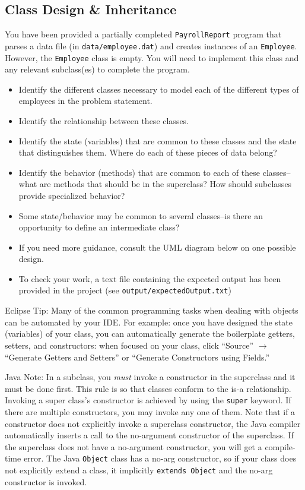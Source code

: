 \documentclass[12pt]{scrartcl}
\begin{document}
\subsection*{Class Design \& Inheritance}

You have been provided a partially completed 
\texttt{PayrollReport} program that parses a data file 
(in \texttt{data/employee.dat}) and creates instances of an 
\texttt{Employee}.  However, the \texttt{Employee} 
class is empty.  You will need to implement this class and any relevant 
subclass(es) to complete the program.  
\begin{itemize}
  \item Identify the different classes necessary to model each of the 
    different types of employees in the problem statement.
  \item Identify the relationship between these classes.
  \item Identify the state (variables) that are common to these classes 
    and the state that distinguishes them.  Where do each of these 
    pieces of data belong?
  \item Identify the behavior (methods) that are common to each of 
    these classes--what are methods that should be in the superclass?  
    How should subclasses provide specialized behavior?
  \item Some state/behavior may be common to several classes--is there 
    an opportunity to define an intermediate class?
  \item If you need more guidance, consult the UML diagram below on 
    one possible design.
  \item To check your work, a text file containing the expected output 
    has been provided in the project (see 
    \texttt{output/expectedOutput.txt})
\end{itemize}

Eclipse Tip: Many of the common programming tasks when dealing with 
objects can be automated by your IDE.  For example: once you have 
designed the state (variables) of your class, you can automatically 
generate the boilerplate getters, setters, and constructors: when 
focused on your class, click ``Source'' $\rightarrow$ ``Generate Getters 
and Setters'' or ``Generate Constructors using Fields.''

Java Note: In a subclass, you \emph{must} invoke a constructor in 
the superclass and it must be done first.  This rule is so that 
classes conform to the is-a relationship.  Invoking a super class's 
constructor is achieved by using the \texttt{super} keyword.  
If there are multiple constructors, you may invoke any one of them.  
Note that if a constructor does not explicitly invoke a superclass 
constructor, the Java compiler automatically inserts a call to the 
no-argument constructor of the superclass. If the superclass does 
not have a no-argument constructor, you will get a compile-time 
error.  The Java \texttt{Object} class has a no-arg 
constructor, so if your class does not explicitly extend a class, 
it implicitly \texttt{extends Object} and the no-arg
constructor is invoked.
\end{document}
